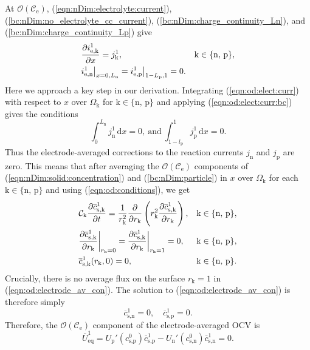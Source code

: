 \documentclass[a4paper]{article}
\newcommand{\ts}[1]{_{\text{#1}}}
\newcommand{\kin}[1]{\text{k} \in \{\text{#1}\}}
\newcommand{\mybar}{\overline}
\begin{document}
At $\mathcal{O}(\mathcal{C}\ts{e})$, (\ref{eqn:nDim:electrolyte:current}), (\ref{bc:nDim:no_electrolyte_cc_current}), (\ref{bc:nDim:charge_continuity_Ln}), and (\ref{bc:nDim:charge_continuity_Lp}) give
\begin{subequations} 
\begin{align}
  &\pdv{i\ts{e,k}^1}{x} = j\ts{k}^1, &&\kin{n, p}, \label{eqn:od:elect:curr}\\ 
	&i\ts{e,n}^1\big|_{x=0,L\ts{n}} = i\ts{e,p}^1\big|_{1-L\ts{p},1} = 0. \label{eqn:od:elect:curr:bc}
\end{align} 
\end{subequations}
Here we approach a key step in our derivation. Integrating (\ref{eqn:od:elect:curr}) with respect to $x$ over $\Omega\ts{k}$ for $\kin{n, p}$ and applying (\ref{eqn:od:elect:curr:bc}) gives the conditions
\begin{equation}\label{eqn:od:conditions} 
  \int_0^{L\ts{n}} j\ts{n}^1\, \text{d}x = 0, \ \text{and} \ \int_{1-l\ts{p}}^1 j\ts{p}^1\, \text{d}x = 0. 
\end{equation}
Thus the electrode-averaged corrections to the reaction currents $j\ts{n}$ and $j\ts{p}$ are zero. This means that after averaging the $\mathcal{O}(\mathcal{C}\ts{e})$ components of (\ref{eqn:nDim:solid:concentration}) and  (\ref{bc:nDim:particle}) in $x$ over $\Omega\ts{k}$ for each $\kin{n, p}$ and using (\ref{eqn:od:conditions}), we get
\begin{subequations}\label{eqn:od:electrode_av_con}
\begin{align}
  &\mathcal{C}\ts{k}\pdv{\mybar{c}\ts{s,k}^1}{t} = \frac{1}{r\ts{k}^2}\pdv{r\ts{k}}\left(r\ts{k}^2 \pdv{\mybar{c}\ts{s,k}^1}{r\ts{k}}\right),  && \kin{n, p},\\
	 &\pdv{\mybar{c}\ts{s,k}^1}{r\ts{k}}\bigg|_{r\ts{k}=0} = 
	 \pdv{\mybar{c}\ts{s,k}^1}{r\ts{k}}\bigg|_{r\ts{k}=1} = 0, &&\kin{n, p},\\ 
	 &\mybar{c}\ts{s,k}^1(r\ts{k}, 0) = 0, && \kin{n, p}.
\end{align} 
\end{subequations} 
Crucially, there is no average flux on the surface $r\ts{k}=1$ in (\ref{eqn:od:electrode_av_con}). The solution to (\ref{eqn:od:electrode_av_con}) is therefore simply
\begin{equation}\label{eqn:od:av_con_sol} 
  \mybar{c}\ts{s,n}^1 = 0, \quad \mybar{c}\ts{s,p}^1 = 0.
\end{equation}
Therefore, the $\mathcal{O}(\mathcal{C}\ts{e})$ component of the electrode-averaged OCV is
\begin{equation}\label{eqn:ueq-bar-1}
  \mybar{U}\ts{eq}^1 = U\ts{p}'(c\ts{s,p}^0)\mybar{c}\ts{s,p}^1 - 
                      U\ts{n}'(c\ts{s,n}^0)\mybar{c}\ts{s,n}^1
                  = 0.
\end{equation}
\end{document}
